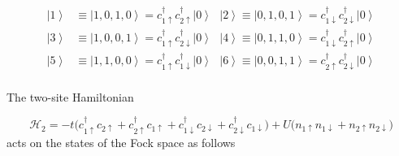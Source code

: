 \begin{equation}
\begin{split}
\left| 1 \right\rangle &\equiv \left| 1, 0, 1, 0 \right\rangle = c_{1\uparrow}^\dagger c_{2\uparrow}^\dagger \left| 0 \right\rangle \,\,\,\,
\left| 2 \right\rangle \equiv \left| 0, 1, 0, 1 \right\rangle = c_{1\downarrow}^\dagger c_{2\downarrow}^\dagger \left| 0 \right\rangle \\
\left| 3 \right\rangle &\equiv \left| 1, 0, 0, 1 \right\rangle = c_{1\uparrow}^\dagger c_{2\downarrow}^\dagger \left| 0 \right\rangle \,\,\,\,
\left| 4 \right\rangle \equiv \left| 0, 1, 1, 0 \right\rangle = c_{1\downarrow}^\dagger c_{2\uparrow}^\dagger \left| 0 \right\rangle \\
\left| 5 \right\rangle &\equiv \left| 1, 1, 0, 0 \right\rangle = c_{1\uparrow}^\dagger c_{1\downarrow}^\dagger \left| 0 \right\rangle \,\,\,\,
\left| 6 \right\rangle \equiv \left| 0, 0, 1, 1 \right\rangle = c_{2\uparrow}^\dagger c_{2\downarrow}^\dagger \left| 0 \right\rangle \\
\end{split}
\end{equation}

The two-site Hamiltonian

\begin{equation}\label{eq:twoSite}
\mathcal{H}_{2} = - t \bigg( c_{1\uparrow}^\dagger c_{2\uparrow} +  c_{2\uparrow}^\dagger c_{1\uparrow} + c_{1\downarrow}^\dagger c_{2\downarrow} +  c_{2\downarrow}^\dagger c_{1\downarrow} \bigg) + U \bigg(n_{1\uparrow}n_{1\downarrow} + n_{2\uparrow}n_{2\downarrow} \bigg)
\end{equation}
acts on the states of the Fock space as follows

